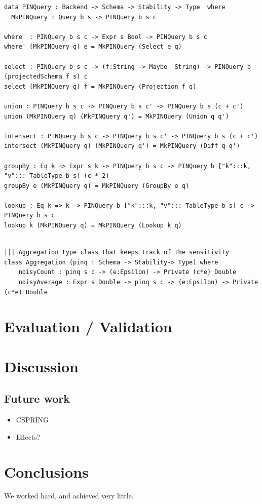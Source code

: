 \documentclass[12pt]{article}
\begin{document}
\begin{lstlisting}[label={lst:pinquery},caption=PINQuery]
data PINQuery : Backend -> Schema -> Stability -> Type  where
  MkPINQuery : Query b s -> PINQuery b s c

where' : PINQuery b s c -> Expr s Bool -> PINQuery b s c
where' (MkPINQuery q) e = MkPINQuery (Select e q)

select : PINQuery b s c -> (f:String -> Maybe  String) -> PINQuery b (projectedSchema f s) c
select (MkPINQuery q) f = MkPINQuery (Projection f q)

union : PINQuery b s c -> PINQuery b s c' -> PINQuery b s (c + c')
union (MkPINQuery q) (MkPINQuery q') = MkPINQuery (Union q q')

intersect : PINQuery b s c -> PINQuery b s c' -> PINQuery b s (c + c')
intersect (MkPINQuery q) (MkPINQuery q') = MkPINQuery (Diff q q')

groupBy : Eq k => Expr s k -> PINQuery b s c -> PINQuery b ["k":::k, "v"::: TableType b s] (c * 2)
groupBy e (MkPINQuery q) = MkPINQuery (GroupBy e q)

lookup : Eq k => k -> PINQuery b ["k":::k, "v"::: TableType b s] c -> PINQuery b s c
lookup k (MkPINQuery q) = MkPINQuery (Lookup k q)

\end{lstlisting}

\begin{lstlisting}[label={lst:aggregation},caption=Aggregation type class]

||| Aggregation type class that keeps track of the sensitivity
class Aggregation (pinq : Schema -> Stability-> Type) where
    noisyCount : pinq s c -> (e:Epsilon) -> Private (c*e) Double
    noisyAverage : Expr s Double -> pinq s c -> (e:Epsilon) -> Private (c*e) Double
\end{lstlisting}

\section{Evaluation / Validation}\label{sec:evaluation}

\section{Discussion}\label{sec:discussion}

\subsection{Future work}\label{sec:future_work}

\begin{itemize}
  \item CSPRING
  \item Effects?
\end{itemize}

\section{Conclusions}\label{sec:conclusions}
We worked hard, and achieved very little.



\end{document}
